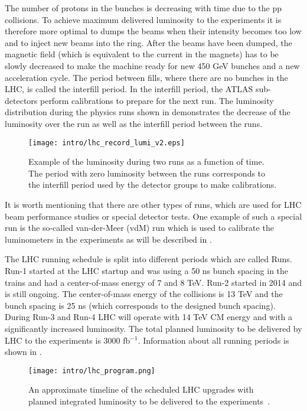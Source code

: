 The number of protons in the bunches is decreasing with time due to the pp collisions.
To achieve maximum delivered luminosity to the experiments 
it is therefore more optimal to dumps the beams when their intensity becomes too low and to inject new beams into the ring.
After the beams have been dumped, the magnetic field (which is equivalent to the current in the magnets) has to be slowly decreased to make the machine ready for new 450 GeV bunches and a new acceleration cycle.
The period between fills, where there are no bunches in the LHC, is called the interfill period. In the interfill period, the ATLAS sub-detectors perform calibrations to prepare for the next run. 
The luminosity distribution during the physics runs shown in  demonstrates
the decrease of the luminosity over the run as well as the interfill period between the runs. 

\begin{figure}[]
  \centering
\texttt{[image: intro/lhc\_record\_lumi\_v2.eps]}
\caption{Example of the luminosity during two runs as a function of time. The period with zero luminosity between the runs corresponds to the interfill period used by the detector groups to make calibrations.}
\label{fig:interfill}
\end{figure}


It is worth mentioning that there are other types of runs, which are used for LHC beam performance studies or special detector tests.
One example of such a special run is the so-called van-der-Meer (vdM) run which is used to calibrate  the luminometers in the experiments as will be described in .

The LHC running schedule is split into different periods which are called Runs. Run-1 started at the LHC startup and was using a 50 ns bunch spacing in the trains and had a center-of-mass energy of 7 and 8 TeV. 
Run-2 started in 2014 and is still ongoing. The center-of-mass energy of the collisions is 13 TeV and the bunch spacing is 25 ns (which corresponds to the designed bunch spacing).
During Run-3 and Run-4 LHC will operate with 14 TeV CM energy and with a significantly increased luminosity. The total planned luminosity to be delivered by LHC to the experiments is 3000 fb$^{-1}$.
Information about all running periods is shown in .

\begin{figure}[]
  \centering
\texttt{[image: intro/lhc\_program.png]}
\caption{An approximate timeline of the scheduled LHC upgrades with planned integrated luminosity to be delivered to the experiments~\cite{Kawamoto:1552862}.}
\label{fig:lhc_program}
\end{figure}


